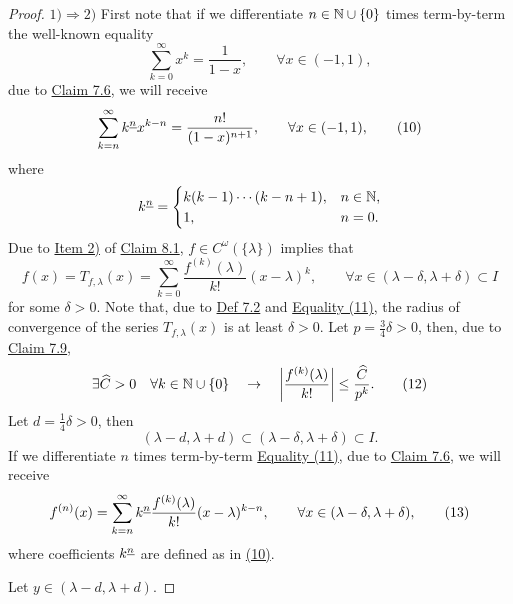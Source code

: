 \begin{proof}
$1)\Rightarrow2)$ First note that if we differentiate $n\in\mathbb{N}\cup\{0\}$ times term-by-term the well-known equality
\[
\sum_{k=0}^{\infty}x^k=\frac{1}{1-x},\qquad \forall x\in(-1,1),
\]
due to \hyperref[claim:7.6]{Claim 7.6}, we will receive
\[
\sum_{k=n}^{\infty}k^{\underline{n}}x^{k-n}=\frac{n!}{(1-x)^{n+1}},
\qquad \forall x\in(-1,1),
\tag{10}\label{eq:8:10:1}
\]
where
\[
k^{\underline{n}}=
\begin{cases}
k(k-1)\cdots(k-n+1),&n\in\mathbb{N},\\
1,&n=0.
\end{cases}
\]
Due to \hyperref[item:claim:8.1:2]{Item 2)} of \hyperref[claim:8.1]{Claim 8.1}, $f\in C^\omega(\{\lambda\})$ implies that
\[
f(x)=T_{f,\lambda}(x)
=\sum_{k=0}^{\infty}\frac{f^{(k)}(\lambda)}{k!}(x-\lambda)^k,
\qquad \forall x\in(\lambda-\delta,\lambda+\delta)\subset I
\tag{11}\label{eq:8:11:1}
\]
for some $\delta>0$.
Note that, due to \hyperref[def:7.2]{Def 7.2} and \hyperref[eq:8:11:1]{Equality (11)}, the radius of convergence of the series $T_{f,\lambda}(x)$ is at least $\delta>0$.
Let $p=\frac34\delta>0$, then, due to \hyperref[claim:7.9]{Claim 7.9},
\[
\exists\widehat C>0\quad \forall k\in\mathbb{N}\cup\{0\}
\quad\to\quad
\left|\frac{f^{(k)}(\lambda)}{k!}\right|\leq\frac{\widehat C}{p^k}.
\tag{12}\label{eq:8:12:1}
\]
Let $d=\frac14\delta>0$, then
\[
(\lambda-d,\lambda+d)\subset(\lambda-\delta,\lambda+\delta)\subset I.
\]
If we differentiate $n$ times term-by-term \hyperref[eq:8:11:1]{Equality (11)}, due to \hyperref[claim:7.6]{Claim 7.6}, we will receive
\[
f^{(n)}(x)
=\sum_{k=n}^{\infty}k^{\underline{n}}\frac{f^{(k)}(\lambda)}{k!}(x-\lambda)^{k-n},
\qquad \forall x\in(\lambda-\delta,\lambda+\delta),
\tag{13}\label{eq:8:13:1}
\]
where coefficients $k^{\underline{n}}$ are defined as in \hyperref[eq:8:10:1]{(10)}.

Let $y\in(\lambda-d,\lambda+d)$.


\end{proof}
